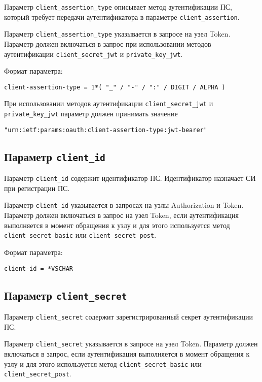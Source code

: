 Параметр \lstinline{client_assertion_type} описывает метод аутентификации ПС,
который требует передачи аутентификатора в параметре 
\lstinline{client_assertion}.

Параметр \lstinline{client_assertion_type} указывается в запросе на узел Token.
%
Параметр должен включаться в запрос при использовании методов аутентификации 
\lstinline{client_secret_jwt} и \lstinline{private_key_jwt}.

Формат параметра:
\begin{lstlisting}
client-assertion-type = 1*( "_" / "-" / ":" / DIGIT / ALPHA )
\end{lstlisting}

При использовании методов аутентификации \lstinline{client_secret_jwt} и 
\lstinline{private_key_jwt} параметр должен принимать значение 
\begin{lstlisting}
"urn:ietf:params:oauth:client-assertion-type:jwt-bearer"
\end{lstlisting}

\subsection{Параметр \lstinline{client_id}}\label{PARAMS.ClientId}

Параметр \lstinline{client_id} содержит идентификатор ПС. Идентификатор 
назначает СИ при регистрации ПС. 

Параметр \lstinline{client_id} указывается в запросах на узлы Authorization и 
Token. 
%
Параметр должен включаться в запрос на узел Token, если аутентификация 
выполняется в момент обращения к узлу и для этого используется  
метод \lstinline{client_secret_basic} или \lstinline{client_secret_post}.

Формат параметра:
\begin{lstlisting}
client-id = *VSCHAR
\end{lstlisting}


\subsection{Параметр \lstinline{client_secret}}\label{PARAMS.ClientSecret}

Параметр \lstinline{client_secret} содержит зарегистрированный секрет 
аутентификации ПС. 

Параметр \lstinline{client_secret} указывается в запросе на узел Token.
%
Параметр должен включаться в запрос, если аутентификация 
выполняется в момент обращения к узлу и для этого используется  
метод \lstinline{client_secret_basic} или \lstinline{client_secret_post}.

